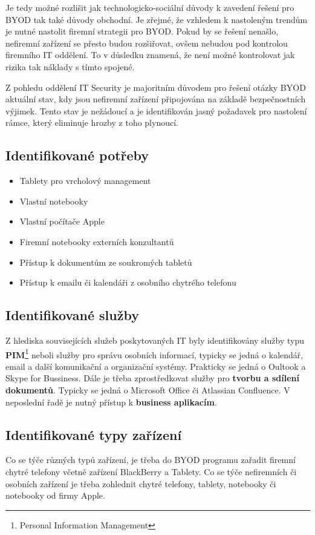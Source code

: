 Je tedy možné rozlišit jak technologicko-sociální důvody k zavedení řešení pro BYOD tak také důvody obchodní. Je zřejmé, že vzhledem k nastoleným trendům je nutné nastolit firemní strategii pro BYOD. Pokud by se řešení nenašlo, nefiremní zařízení se přesto budou rozšiřovat, ovšem nebudou pod kontrolou firemního IT oddělení. To v důsledku znamená, že není možné kontrolovat jak rizika tak náklady s tímto spojené. 

Z pohledu oddělení IT Security je majoritním důvodem pro řešení otázky BYOD aktuální stav, kdy jsou nefiremní zařízení připojována na základě bezpečnostních výjimek. Tento stav je nežádoucí a je identifikován jasný požadavek pro nastolení rámce, který eliminuje hrozby z toho plynoucí.


\subsection{Identifikované potřeby}
\begin{itemize}
    \item Tablety pro vrcholový management
    \item Vlastní notebooky
    \item Vlastní počítače Apple
    \item Firemní notebooky externích konzultantů
    \item Přístup k dokumentům ze soukromých tabletů
    \item Přístup k emailu či kalendáři z osobního chytrého telefonu
\end{itemize}

\subsection{Identifikované služby}
Z hlediska souvisejících služeb poskytovaných IT byly identifikovány služby typu \textbf{PIM}\footnote{Personal Information Management} neboli služby pro správu osobních informací, typicky se jedná o kalendář, email a další komunikační a organizační systémy. Prakticky se jedná o Oultook a Skype for Bussiness. Dále je třeba zprostředkovat služby pro \textbf{tvorbu a sdílení dokumentů}. Typicky se jedná o Microsoft Office či Atlassian Confluence. V neposlední řadě je nutný přístup k \textbf{business aplikacím}.

\subsection{Identifikované typy zařízení}
Co se týče různých typů zařízení, je třeba do BYOD programu zařadit firemní chytré telefony včetně zařízení BlackBerry a Tablety. Co se týče nefiremních či osobních zařízení je třeba zohlednit chytré telefony, tablety, notebooky či notebooky od firmy Apple.

